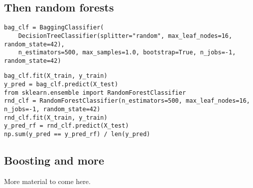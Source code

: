 \documentclass[%
oneside,                 %
final,                   %
10pt]{article}
\begin{document}
\subsection*{Then random forests}
\begin{verbatim}
bag_clf = BaggingClassifier(
    DecisionTreeClassifier(splitter="random", max_leaf_nodes=16, random_state=42),
    n_estimators=500, max_samples=1.0, bootstrap=True, n_jobs=-1, random_state=42)
\end{verbatim}



\begin{verbatim}
bag_clf.fit(X_train, y_train)
y_pred = bag_clf.predict(X_test)
from sklearn.ensemble import RandomForestClassifier
rnd_clf = RandomForestClassifier(n_estimators=500, max_leaf_nodes=16, n_jobs=-1, random_state=42)
rnd_clf.fit(X_train, y_train)
y_pred_rf = rnd_clf.predict(X_test)
np.sum(y_pred == y_pred_rf) / len(y_pred) 
\end{verbatim}


\subsection*{Boosting and more}
More material to come here.



\end{document}
